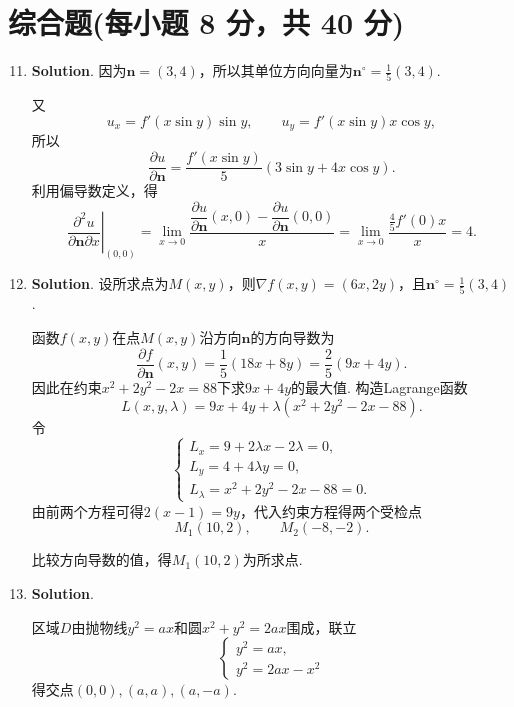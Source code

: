 \documentclass[../main.tex]{subfiles}
\begin{document}
\section{综合题(每小题 8 分，共 40 分)}
\begin{enumerate}
    \setcounter{enumi}{10}

    \item \textbf{Solution}. 因为$\boldsymbol{n}=(3,4)$，所以其单位方向向量为$\boldsymbol
              {n}^{\circ}=\frac{1}{5}(3,4)$.

          又
          \[
              u_{x}=f'(x\sin y)\sin y,\qquad u_{y}=f'(x\sin y)x\cos y,
          \]
          所以
          \[
              \frac{\partial u}{\partial \boldsymbol{n}}=\frac{f'(x\sin y)}{5}(3\sin y+
              4x\cos y).
          \]
          利用偏导数定义，得
          \[
              \left.\frac{\partial^{2}u}{\partial \boldsymbol{n}\partial x}\right|_{(0,0)}
              =\lim_{x\to0}\frac{\dfrac{\partial u}{\partial \boldsymbol{n}}(x,0) -\dfrac{\partial u}{\partial \boldsymbol{n}}(0,0)}{x}
              =\lim_{x\to0}\frac{\frac{4}{5}f'(0)x}{x}=4.
          \]

    \item \textbf{Solution}. 设所求点为$M(x,y)$，则$\nabla f(x,y)=(6x,2y)$，且$\boldsymbol
              {n}^{\circ}=\frac{1}{5}(3,4)$.

          函数$f(x,y)$在点$M(x,y)$沿方向$\boldsymbol{n}$的方向导数为
          \[
              \frac{\partial f}{\partial \boldsymbol{n}}(x,y)=\frac{1}{5}(18x+8y) =\frac{2}{5}
              (9x+4y).
          \]
          因此在约束$x^{2}+2y^{2}-2x=88$下求$9x+4y$的最大值. 构造Lagrange函数
          \[
              L(x,y,\lambda)=9x+4y+\lambda(x^{2}+2y^{2}-2x-88).
          \]
          令
          \[
              \begin{cases}
                  L_{x}=9+2\lambda x-2\lambda=0, \\
                  L_{y}=4+4\lambda y=0,          \\
                  L_{\lambda}=x^{2}+2y^{2}-2x-88=0.
              \end{cases}
          \]
          由前两个方程可得$2(x-1)=9y$，代入约束方程得两个受检点
          \[
              M_{1}(10,2),\qquad M_{2}(-8,-2).
          \]

          比较方向导数的值，得$M_{1}(10,2)$为所求点.

    \item \textbf{Solution}.

          \noindent
          \begin{minipage}[c]{0.57\textwidth}
              区域$D$由抛物线$y^{2}=ax$和圆$x^{2}+y^{2}=2ax$围成，联立
              \[
                  \begin{cases}
                      y^{2}=ax, \\
                      y^{2}=2ax-x^{2}
                  \end{cases}
              \]
              得交点$(0,0),(a,a),(a,-a)$.


\end{minipage}
\end{enumerate}
\end{document}
